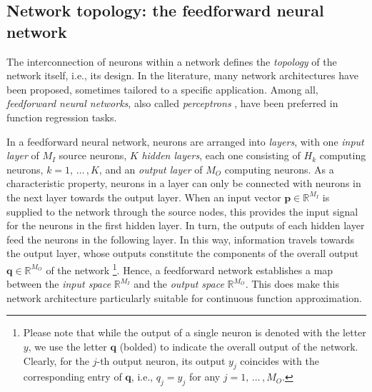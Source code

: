 \documentclass[longtitle]{elsarticle}
\numberwithin{equation}{section}
\theoremstyle{theorem}
\theoremstyle{definition}
\theoremstyle{remark}
\theoremstyle{proposition}
\numberwithin{figure}{section}
\begin{document}
		
	
	\subsection{Network topology: the feedforward neural network}
	\label{section:Network topology}
	
		The interconnection of neurons within a network defines the \emph{topology} of the network itself, i.e., its design. In the literature, many network architectures have been proposed, sometimes tailored to a specific application. Among all, \emph{feedforward neural networks}, also called \emph{perceptrons} \cite{Ros58}, have been preferred in function regression tasks.
		
		In a feedforward neural network, neurons are arranged into \emph{layers}, with one \emph{input layer} of $M_I$ source neurons, $K$ \emph{hidden layers}, each one consisting of $H_k$ computing neurons, $k = 1, \, \ldots \, , K$, and an \emph{output layer} of $M_O$ computing neurons. As a characteristic property, neurons in a layer can only be connected with neurons in the next layer towards the output layer. When an input vector $\mathbf{p} \in \mathbb{R}^{M_I}$ is supplied to the network through the source nodes, this provides the input signal for the neurons in the first hidden layer. In turn, the outputs of each hidden layer feed the neurons in the following layer. In this way, information travels towards the output layer, whose outputs constitute the components of the overall output $\mathbf{q} \in \mathbb{R}^{M_O}$ of the network \footnote{Please note that while the output of a single neuron is denoted with the letter $y$, we use the letter $\mathbf{q}$ (bolded) to indicate the overall output of the network. Clearly, for the $j$-th output neuron, its output $y_j$ coincides with the corresponding entry of $\mathbf{q}$, i.e., $q_j = y_j$ for any $j = 1, \, \ldots \, , M_O$.}. Hence, a feedforward network establishes a map between the \emph{input space} $\mathbb{R}^{M_I}$ and the \emph{output space} $\mathbb{R}^{M_O}$. This does make this network architecture particularly suitable for continuous function approximation.
		
\end{document}
